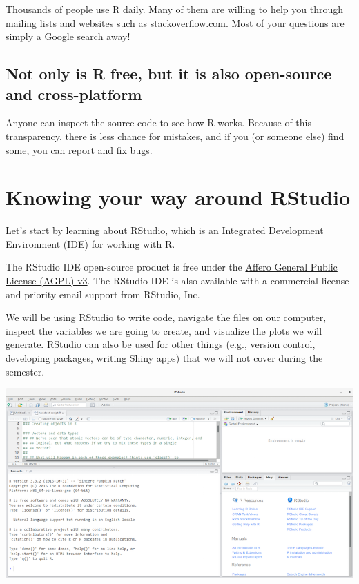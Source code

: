 \documentclass[11pt]{article}
\begin{document}
Thousands of people use R daily. Many of them are willing to help you through mailing lists and websites such as \href{https://stackoverflow.com/}{stackoverflow.com}.  Most of your questions are simply a Google search away!

\subsection*{Not only is R free, but it is also open-source and cross-platform}
\label{sec-2-7}

Anyone can inspect the source code to see how R works. Because of this transparency, there is less chance for mistakes, and if you (or someone else) find some, you can report and fix bugs.

\section*{Knowing your way around RStudio}
\label{sec-3}

Let's start by learning about \href{https://www.rstudio.com/}{RStudio}, which is an Integrated Development Environment (IDE) for working with R.

The RStudio IDE open-source product is free under the
\href{https://www.gnu.org/licenses/agpl-3.0.en.html}{Affero General Public License (AGPL) v3}.  The RStudio IDE is also available with a commercial license and priority email support from RStudio, Inc.

We will be using RStudio to write code, navigate the files on our computer, inspect the variables we are going to create, and visualize the plots we will generate. RStudio can also be used for other things (e.g., version control, developing packages, writing Shiny apps) that we will not cover during the semester.

\includegraphics[width=.9\linewidth]{figures/rstudio-screenshot.png}
\end{document}
